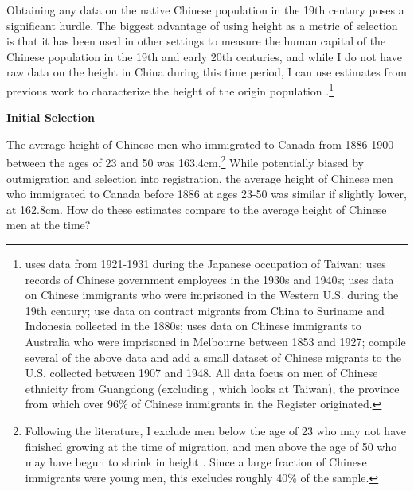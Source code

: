 Obtaining any data on the native Chinese population in the 19th century poses a significant hurdle. The biggest advantage of using height as a metric of selection is that it has been used in other settings to measure the human capital of the Chinese population in the 19th and early 20th centuries, and while I do not have raw data on the height in China during this time period, I can use estimates from previous work to characterize the height of the origin population \citep{olds2003, morgan2004, carson2006, batenhira2008, morgan2009, batenetal2010}.\footnote{\citet{olds2003} uses data from 1921-1931 during the Japanese occupation of Taiwan; \citet{morgan2004} uses records of Chinese government employees in the 1930s and 1940s; 
\citet{carson2006} uses data on Chinese immigrants who were imprisoned in the Western U.S. during the 19th century; 
\citet{batenhira2008} use data on contract migrants from China to Suriname and Indonesia collected in the 1880s; 
\citet{morgan2009} uses data on Chinese immigrants to Australia who were imprisoned in Melbourne between 1853 and 1927;
\citet{batenetal2010} compile several of the above data and add a small dataset of Chinese migrants to the U.S. collected between 1907 and 1948. All data focus on men of Chinese ethnicity from Guangdong (excluding \citet{olds2003}, which looks at Taiwan), the province from which over 96\% of Chinese immigrants in the Register originated.}

\vspace{2mm}
\noindent \textbf{Initial Selection} \par 
The average height of Chinese men who immigrated to Canada from 1886-1900 between the ages of 23 and 50 was 163.4cm.\footnote{Following the literature, I exclude men below the age of 23 who may not have finished growing at the time of migration, and men above the age of 50 who may have begun to shrink in height \citep{batenetal2010}. Since a large fraction of Chinese immigrants were young men, this excludes roughly 40\% of the sample.} While potentially biased by outmigration and selection into registration, the average height of Chinese men who immigrated to Canada before 1886 at ages 23-50 was similar if slightly lower, at 162.8cm. How do these estimates compare to the average height of Chinese men at the time?

